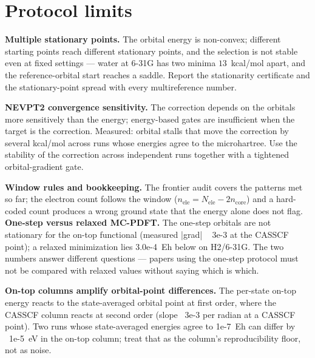 \section{Protocol limits}

\textbf{Multiple stationary points.}  The orbital energy is
non-convex; different starting points reach different stationary
points, and the selection is not stable even at fixed settings ---
water at 6-31G has two minima $13$~kcal/mol apart, and the
reference-orbital start reaches a saddle.  Report the stationarity
certificate and the stationary-point spread with every multireference
number.

\textbf{NEVPT2 convergence sensitivity.}  The correction depends on
the orbitals more sensitively than the energy; energy-based gates are
insufficient when the target is the correction.  Measured: orbital
stalls that move the correction by several kcal/mol across runs whose
energies agree to the microhartree.  Use the stability of the
correction across independent runs together with a tightened
orbital-gradient gate.

\textbf{Window rules and bookkeeping.}  The frontier audit covers the
patterns met so far; the electron count follows the window
($n_\mathrm{ele} = N_\mathrm{ele} - 2 n_\mathrm{core}$) and a
hard-coded count produces a wrong ground state that the energy alone
does not flag.
\textbf{One-step versus relaxed MC-PDFT.}  The one-step orbitals are not stationary for the on-top functional (measured |grad| ~ 3e-3 at the CASSCF point); a relaxed minimization lies 3.0e-4~Eh below on H2/6-31G.  The two numbers answer different questions --- papers using the one-step protocol must not be compared with relaxed values without saying which is which.

\textbf{On-top columns amplify orbital-point differences.}  The per-state on-top energy reacts to the state-averaged orbital point at first order, where the CASSCF column reacts at second order (slope ~3e-3 per radian at a CASSCF point).  Two runs whose state-averaged energies agree to 1e-7~Eh can differ by ~1e-5~eV in the on-top column; treat that as the column's reproducibility floor, not as noise.

